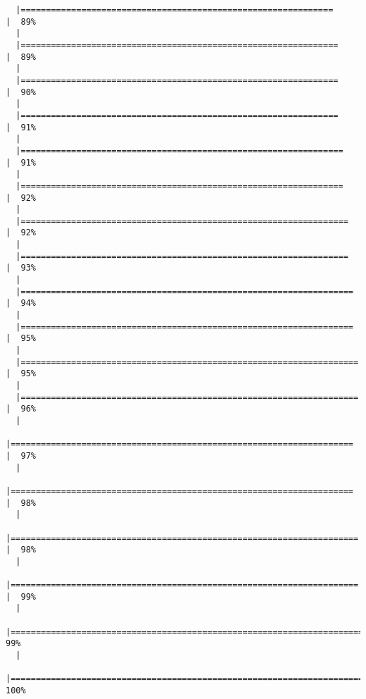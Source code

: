 \documentclass[
  letterpaper,
]{book}
\begin{document}
\begin{verbatim}
  |==============================================================        |  89%
  |                                                                            
  |===============================================================       |  89%
  |                                                                            
  |===============================================================       |  90%
  |                                                                            
  |===============================================================       |  91%
  |                                                                            
  |================================================================      |  91%
  |                                                                            
  |================================================================      |  92%
  |                                                                            
  |=================================================================     |  92%
  |                                                                            
  |=================================================================     |  93%
  |                                                                            
  |==================================================================    |  94%
  |                                                                            
  |==================================================================    |  95%
  |                                                                            
  |===================================================================   |  95%
  |                                                                            
  |===================================================================   |  96%
  |                                                                            
  |====================================================================  |  97%
  |                                                                            
  |====================================================================  |  98%
  |                                                                            
  |===================================================================== |  98%
  |                                                                            
  |===================================================================== |  99%
  |                                                                            
  |======================================================================|  99%
  |                                                                            
  |======================================================================| 100%
\end{verbatim}
\end{document}

